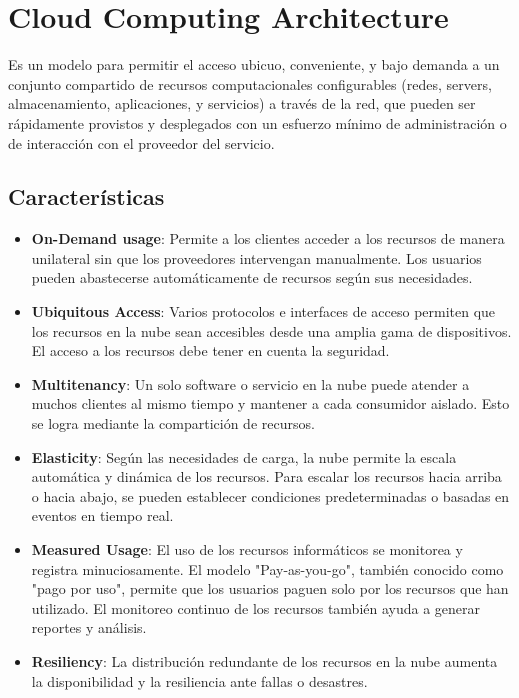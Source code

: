 \documentclass{article}
\begin{document}
		
		
		
		\section{Cloud Computing Architecture}
		Es un modelo para permitir el acceso ubicuo, conveniente, y bajo demanda a un conjunto compartido de recursos computacionales configurables (redes, servers, almacenamiento, aplicaciones, y servicios) a través de la red, que pueden ser rápidamente provistos y desplegados con un esfuerzo mínimo de administración o de interacción con el proveedor del servicio.
		
		\subsection{Características}
		
		\begin{itemize}
		
			\item {\textbf{On-Demand usage}}: Permite a los clientes acceder a los recursos de manera unilateral sin que los proveedores intervengan manualmente. Los usuarios pueden abastecerse automáticamente de recursos según sus necesidades.
		
			\item {\textbf{Ubiquitous Access}}: Varios protocolos e interfaces de acceso permiten que los recursos en la nube sean accesibles desde una amplia gama de dispositivos. El acceso a los recursos debe tener en cuenta la seguridad.
		
			\item {\textbf{Multitenancy}}: Un solo software o servicio en la nube puede atender a muchos clientes al mismo tiempo y mantener a cada consumidor aislado. Esto se logra mediante la compartición de recursos.
		
			\item {\textbf{Elasticity}}: Según las necesidades de carga, la nube permite la escala automática y dinámica de los recursos. Para escalar los recursos hacia arriba o hacia abajo, se pueden establecer condiciones predeterminadas o basadas en eventos en tiempo real.
			
			\item {\textbf{Measured Usage}}: El uso de los recursos informáticos se monitorea y registra minuciosamente. El modelo "Pay-as-you-go", también conocido como "pago por uso", permite que los usuarios paguen solo por los recursos que han utilizado. El monitoreo continuo de los recursos también ayuda a generar reportes y análisis.
			
			
			\item {\textbf{Resiliency}}: La distribución redundante de los recursos en la nube aumenta la disponibilidad y la resiliencia ante fallas o desastres.
			
		\end{itemize}
\end{document}
